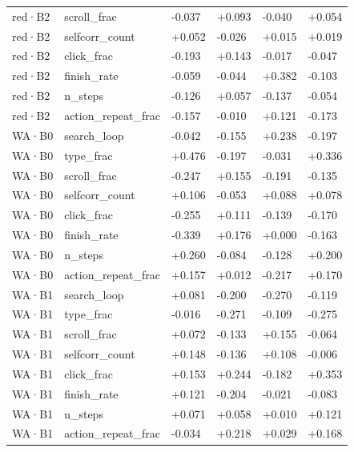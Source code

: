 \begin{table}[tp]
\begin{tabular}{@{}llllll@{}}
red·B2 & scroll\_frac & -0.037 & +0.093 & -0.040 & +0.054 \\
red·B2 & selfcorr\_count & +0.052 & -0.026 & +0.015 & +0.019 \\
red·B2 & click\_frac & -0.193 & +0.143 & -0.017 & -0.047 \\
red·B2 & finish\_rate & -0.059 & -0.044 & +0.382 & -0.103 \\
red·B2 & n\_steps & -0.126 & +0.057 & -0.137 & -0.054 \\
red·B2 & action\_repeat\_frac & -0.157 & -0.010 & +0.121 & -0.173 \\
WA·B0 & search\_loop & -0.042 & -0.155 & +0.238 & -0.197 \\
WA·B0 & type\_frac & +0.476 & -0.197 & -0.031 & +0.336 \\
WA·B0 & scroll\_frac & -0.247 & +0.155 & -0.191 & -0.135 \\
WA·B0 & selfcorr\_count & +0.106 & -0.053 & +0.088 & +0.078 \\
WA·B0 & click\_frac & -0.255 & +0.111 & -0.139 & -0.170 \\
WA·B0 & finish\_rate & -0.339 & +0.176 & +0.000 & -0.163 \\
WA·B0 & n\_steps & +0.260 & -0.084 & -0.128 & +0.200 \\
WA·B0 & action\_repeat\_frac & +0.157 & +0.012 & -0.217 & +0.170 \\
WA·B1 & search\_loop & +0.081 & -0.200 & -0.270 & -0.119 \\
WA·B1 & type\_frac & -0.016 & -0.271 & -0.109 & -0.275 \\
WA·B1 & scroll\_frac & +0.072 & -0.133 & +0.155 & -0.064 \\
WA·B1 & selfcorr\_count & +0.148 & -0.136 & +0.108 & -0.006 \\
WA·B1 & click\_frac & +0.153 & +0.244 & -0.182 & +0.353 \\
WA·B1 & finish\_rate & +0.121 & -0.204 & -0.021 & -0.083 \\
WA·B1 & n\_steps & +0.071 & +0.058 & +0.010 & +0.121 \\
WA·B1 & action\_repeat\_frac & -0.034 & +0.218 & +0.029 & +0.168 \\
\bottomrule
\end{tabular}
\end{table}
